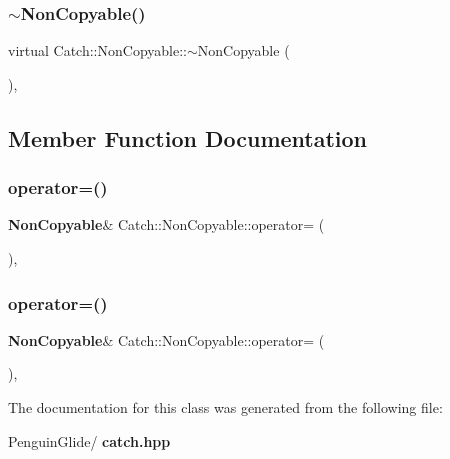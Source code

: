 \subsubsection{$\sim$NonCopyable()}
{\footnotesize\ttfamily virtual Catch\+::\+Non\+Copyable\+::$\sim$\+Non\+Copyable (\begin{DoxyParamCaption}{ }\end{DoxyParamCaption})\hspace{0.3cm}{\ttfamily [protected]}, {\ttfamily [virtual]}}



\subsection{Member Function Documentation}
\mbox{\label{class_catch_1_1_non_copyable_a958b5f57d45fdd6f418bec8b46a629ab}} 
\subsubsection{operator=()\hspace{0.1cm}{\footnotesize\ttfamily [1/2]}}
{\footnotesize\ttfamily \textbf{ Non\+Copyable}\& Catch\+::\+Non\+Copyable\+::operator= (\begin{DoxyParamCaption}\item[{\textbf{ Non\+Copyable} const \&}]{ }\end{DoxyParamCaption})\hspace{0.3cm}{\ttfamily [private]}, {\ttfamily [delete]}}

\mbox{\label{class_catch_1_1_non_copyable_a317697b6d3c4cda093666ce61d3a1e31}} 
\subsubsection{operator=()\hspace{0.1cm}{\footnotesize\ttfamily [2/2]}}
{\footnotesize\ttfamily \textbf{ Non\+Copyable}\& Catch\+::\+Non\+Copyable\+::operator= (\begin{DoxyParamCaption}\item[{\textbf{ Non\+Copyable} \&\&}]{ }\end{DoxyParamCaption})\hspace{0.3cm}{\ttfamily [private]}, {\ttfamily [delete]}}



The documentation for this class was generated from the following file\+:\begin{DoxyCompactItemize}
\item 
Penguin\+Glide/\textbf{ catch.\+hpp}\end{DoxyCompactItemize}

